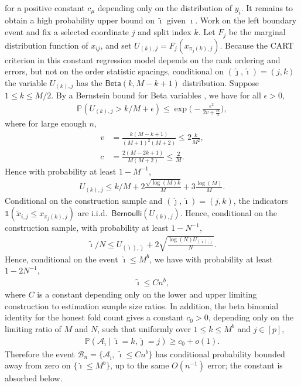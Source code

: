 \documentclass[10pt]{article}
\def\P{\mathbb{P}}
\newcommand{\Indicator}{\mathds{1}}
\theoremstyle{definition}
\theoremstyle{remark}
\begin{document}
for a positive constant $c_\mu$ depending only on the distribution of $y_i$.
It remains to obtain a high probability upper bound on $\tilde \imath$ given $\imath$. Work on the left boundary event and fix a selected coordinate $j$ and split index $k$. Let $F_j$ be the marginal distribution function of $x_{ij}$, and set $U_{(k),j}=F_j(x_{\pi_j(k),j})$. Because the CART criterion in this constant regression model depends on the rank ordering and errors, but not on the order statistic spacings, conditional on $(\hat{\jmath},\hat{\imath})=(j,k)$ the variable $U_{(k),j}$ has the $\mathsf{Beta}(k,M-k+1)$ distribution. Suppose $1 \leq k \leq M/2$. By a Bernstein bound for Beta variables \cite[Theorem 1]{skorski_2023}, we have for all $\epsilon > 0$,
\begin{align*}
    \P(U_{(k),j} > k/M + \epsilon) \leq \exp \Big( - \frac{\epsilon^2}{2 v + \frac{c \epsilon}{3}}\Big),
\end{align*}
where for large enough $n$,
\begin{align*}
    v & = \frac{k (M - k + 1)}{(M + 1)^2 (M + 2)} \leq 2\frac{k}{M^2}, \\
    c & = \frac{2 (M - 2k + 1)}{M (M + 2)} \leq \frac{2}{M}.
\end{align*}
Hence with probability at least $1 - M^{-1}$, 
\begin{align*}
    U_{(k),j} \leq k/M + 2\frac{\sqrt{\log (M) k}}{M} + 3 \frac{\log (M)}{M}.
\end{align*}
Conditional on the construction sample and $(\hat{\jmath},\hat{\imath})=(j,k)$, the indicators $\Indicator(\tilde{x}_{i,j} \leq x_{\pi_j(k),j})$ are i.i.d.\ $\mathsf{Bernoulli}(U_{(k),j})$. Hence, conditional on the construction sample, with probability at least $1 - N^{-1}$,
\begin{align*}
    \tilde{\imath}/N
    \leq U_{(\hat{\imath}),\hat{\jmath}}
    + 2 \sqrt{\frac{\log(N) U_{(\hat{\imath}),\hat{\jmath}}}{N}}.
\end{align*}
Hence, conditional on the event $\hat{\imath} \leq M^b$, we have with probability at least $1 - 2 N^{-1}$,
\begin{align*}
    \tilde{\imath} \leq C n^b,
\end{align*}
where $C$ is a constant depending only on the lower and upper limiting
construction to estimation sample size ratios.
In addition, the beta binomial identity for the honest fold count gives a constant $c_0>0$, depending only on the limiting ratio of $M$ and $N$, such that uniformly over $1\leq k\leq M^b$ and $j\in[p]$,
\begin{align*}
    \P(\mathcal A_{\tilde{\imath}}\mid \hat{\imath}=k,\hat{\jmath}=j)\geq c_0+o(1).
\end{align*}
Therefore the event $\mathcal B_n=\{\mathcal A_{\tilde{\imath}},\,\tilde{\imath}\leq C n^b\}$ has conditional probability bounded away from zero on $\{\hat{\imath}\leq M^b\}$, up to the same $O(n^{-1})$ error; the constant is absorbed below.
\end{document}
